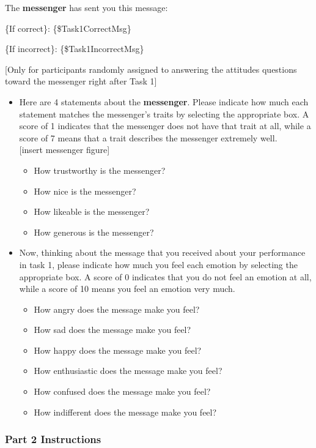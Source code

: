 The
\textbf{messenger} has sent you this message: 

\{If correct\}: \{\$Task1CorrectMsg\}

\{If
incorrect\}: \{\$Task1IncorrectMsg\}

[Only for participants randomly assigned to answering the attitudes questions
toward the messenger right after Task 1]

\begin{itemize}
	\item Here are 4 statements about the \textbf{messenger}. Please indicate how much each
statement matches the messenger's traits by selecting the appropriate box. A
score of 1 indicates that the messenger does not have that trait at all, while a
score of 7 means that a trait describes the messenger extremely well.
\\
{[insert messenger figure]}
\begin{itemize}
    \item How trustworthy is the messenger? 
    \item How nice is the messenger? 
    \item How likeable is the messenger? 
    \item How generous is the messenger?
\end{itemize}

\item Now, thinking about the message that you received about your performance
in task 1, please indicate how much you feel each emotion by selecting the
appropriate box. A score of 0 indicates that you do not feel an emotion at all,
while a score of 10 means you feel an emotion very much.
\begin{itemize}
\item How angry does the message make you feel?
\item How sad does the message make you feel?
\item How happy does the message make you feel?
\item How enthusiastic does the message make you feel?
\item How confused does the message make you feel?
\item How indifferent does the message make you feel?
\end{itemize}
\end{itemize}

\subsubsection*{Part 2 Instructions}


